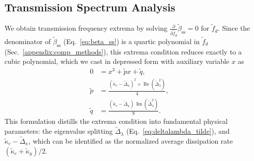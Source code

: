 \documentclass[%
  reprint,
  amsmath,amssymb,
  aps,
  prapplied,
  superscriptaddress,
  longbibliography]{revtex4-2}
\begin{document}
\subsection{\label{subsec:transmission_spectrum} Transmission Spectrum Analysis}

We obtain transmission frequency extrema by solving $\frac{\partial}{\partial \tilde{f}_d}\tilde{\beta}_{\mathrm{ss}}=0$ for $\tilde{f}_d$. Since the denominator of $\tilde{\beta}_{\mathrm{ss}}$ (Eq.~\ref{eq:beta_ss}) is a quartic polynomial in $\tilde{f}_d$ (Sec.~\ref{appendix:comp_methods}), this extrema condition reduces exactly to a cubic polynomial, which we cast in depressed form with auxiliary variable $x$ as
\begin{align}
    0 &= x^3 + \tilde{p}x + \tilde{q}, \label{eq:cubic} \\
    \tilde{p} &= \frac{ (\tilde{\kappa}_c - \tilde{\Delta}_\kappa)^2 + \operatorname{Re}(\tilde{\Delta}_\lambda^2) }{4}, \label{eq:p} \\
    \tilde{q} &= \frac{ (\tilde{\kappa}_c - \tilde{\Delta}_\kappa) \, \operatorname{Im}(\tilde{\Delta}_\lambda^2) }{8}. \label{eq:q}
\end{align}
This formulation distills the extrema condition into fundamental physical parameters: the eigenvalue splitting $\tilde{\Delta}_\lambda$ (Eq.~\ref{eq:deltalambda_tilde}), and $\tilde{\kappa}_c - \tilde{\Delta}_\kappa$, which can be identified as the normalized average dissipation rate $(\tilde{\kappa}_c + \tilde{\kappa}_y)/2$. 
\end{document}
